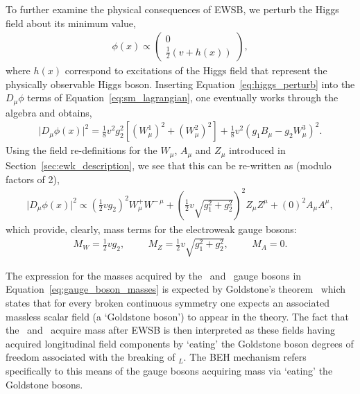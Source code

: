 To further examine the physical consequences of EWSB,
we perturb the Higgs field about its minimum value,
\begin{align}
	\phi(x) \propto \left( \begin{matrix} 0 \\ \frac{1}{2}(v + h(x)) \end{matrix} \right),
	\label{eq:higgs_perturb}
\end{align}
where $h(x)$ correspond to excitations of the Higgs field that represent the physically observable
Higgs boson.
Inserting Equation~\ref{eq:higgs_perturb} into the $\mathit{D}_{\mu}\phi$ terms
of Equation~\ref{eq:sm_lagrangian}, one eventually works through the algebra and obtains,
\begin{align}
	\lvert\mathit{D}_{\mu} \phi(x)\rvert^2 = \frac{1}{8} v^2 g_2^2 \left[ \left( W^1_{\mu} \right)^2 +\left( W^2_{\mu} \right)^2 \right] 
		+ \frac{1}{8} v^2 \left( g_1 B_{\mu} - g_2 W_{\mu}^3 \right)^2.
	\label{eq:higgs_gauge_expand} 
\end{align}
Using the field re-definitions for the $W_{\mu}$, $A_{\mu}$ and $Z_{\mu}$ introduced in Section~\ref{sec:ewk_description}, we see that this can be re-written as (modulo factors of 2),
\begin{align}
	\lvert\mathit{D}_{\mu} \phi(x)\rvert^2 \propto \left(\frac{1}{2} v g_2 \right)^2 W_{\mu}^+ W^{-\,\mu} + \left( \frac{1}{2}v \sqrt{g_1^2 + g_2^2} \right)^2 Z_{\mu} Z^{\mu} + (0)^2 A_{\mu} A^{\mu},
	\label{eq:higgs_gauge_masses}
\end{align}
which provide, clearly, mass terms for the electroweak gauge bosons:
\begin{align}
	M_W = \frac{1}{2}v g_2, \hspace{1cm} M_Z = \frac{1}{2}v\sqrt{g_1^2 + g_2^2}, \hspace{1cm} M_A = 0.
	\label{eq:gauge_boson_masses}
\end{align}


The expression for the masses acquired by the \fieldWpm~and \fieldZ~gauge bosons in Equation~\ref{eq:gauge_boson_masses} is expected by Goldstone's theorem~\cite{Goldstone:1962es} which
states that for every broken continuous symmetry one expects an associated massless
scalar field (a `Goldstone boson') to appear in the theory. The fact that the \fieldWpm~and \fieldZ~acquire
mass after EWSB is then interpreted as these fields having acquired longitudinal field
components by `eating' the Goldstone boson degrees of freedom associated with the
breaking of \SUtwo$_L$. The BEH mechanism refers specifically to this means of the gauge
bosons acquiring mass via `eating' the Goldstone bosons.

